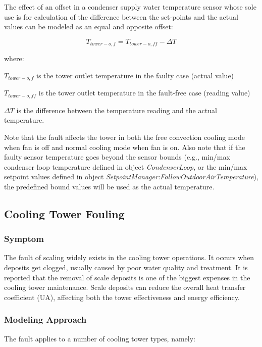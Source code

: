 The effect of an offset in a condenser supply water temperature sensor whose sole use is for calculation of the difference between the set-points and the actual values can be modeled as an equal and opposite offset: 

\begin{equation}
T_{tower-o,f} = T_{tower-o,ff} - \Delta T
\end{equation}

where:

\(T_{tower-o,f}\) is the tower outlet temperature in the faulty case (actual value)

\(T_{tower-o,ff}\) is the tower outlet temperature in the fault-free case (reading value)

\(\Delta T\) is the difference between the temperature reading and the actual temperature.

Note that the fault affects the tower in both the free convection cooling mode when fan is off and normal cooling mode when fan is on. Also note that if the faulty sensor temperature goes beyond the sensor bounds (e.g., min/max condenser loop temperature defined in object \emph{CondenserLoop}, or the min/max setpoint values defined in object \emph{SetpointManager:FollowOutdoorAirTemperature}), the predefined bound values will be used as the actual temperature.


\subsection{Cooling Tower Fouling}\label{cooling-tower-fouling}

\subsubsection{Symptom}

The fault of scaling widely exists in the cooling tower operations. It occurs when deposits get clogged, usually caused by poor water quality and treatment. It is reported that the removal of scale deposits is one of the biggest expenses in the cooling tower maintenance. Scale deposits can reduce the overall heat transfer coefficient (UA), affecting both the tower effectiveness and energy efficiency.

\subsubsection{Modeling Approach}

The fault applies to a number of cooling tower types, namely:


